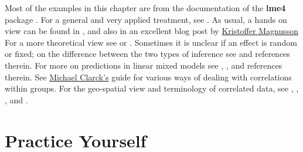 \documentclass[]{book}
\theoremstyle{definition}
\theoremstyle{definition}
\theoremstyle{definition}
\theoremstyle{remark}
\begin{document}
Most of the examples in this chapter are from the documentation of the
\textbf{lme4} package \citep{lme4}. For a general and very applied
treatment, see \citet{pinero2000mixed}. As usual, a hands on view can be
found in \citet{venables2013modern}, and also in an excellent blog post
by
\href{http://rpsychologist.com/r-guide-longitudinal-lme-lmer}{Kristoffer
Magnusson} For a more theoretical view see \citet{weiss2005modeling} or
\citet{searle2009variance}. Sometimes it is unclear if an effect is
random or fixed; on the difference between the two types of inference
see \citet{rosset2018fixed} and references therein. For more on
predictions in linear mixed models see \citet{robinson1991blup},
\citet{rabinowicz2018assessing}, and references therein. See
\href{https://m-clark.github.io/docs/clustered/}{Michael Clarck's} guide
for various ways of dealing with correlations within groups. For the
geo-spatial view and terminology of correlated data, see
\citet{christakos2000modern}, \citet{diggle1998model},
\citet{allard2013j}, and \citet{cressie2015statistics}.

\section{Practice Yourself}\label{practice-yourself-4}
\end{document}
